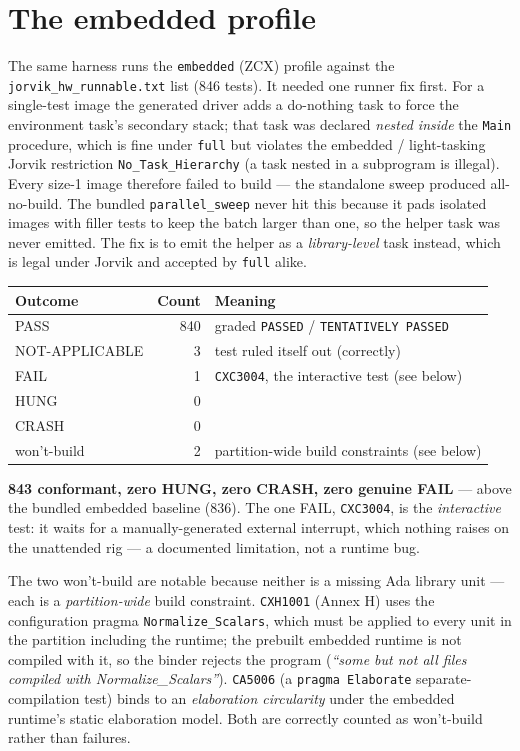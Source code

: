 \section{The embedded profile}

The same harness runs the \texttt{embedded} (ZCX) profile against the
\texttt{jorvik\_hw\_runnable.txt} list (846 tests). It needed one runner fix first. For a
single-test image the generated driver adds a do-nothing task to force the environment
task's secondary stack; that task was declared \emph{nested inside} the \texttt{Main}
procedure, which is fine under \texttt{full} but violates the embedded / light-tasking
Jorvik restriction \texttt{No\_Task\_Hierarchy} (a task nested in a subprogram is illegal).
Every size-1 image therefore failed to build --- the standalone sweep produced
all-no-build. The bundled \texttt{parallel\_sweep} never hit this because it pads
isolated images with filler tests to keep the batch larger than one, so the helper task
was never emitted. The fix is to emit the helper as a \emph{library-level} task instead,
which is legal under Jorvik and accepted by \texttt{full} alike.

\begin{longtable}{p{4.5cm} r p{6.5cm}}
\toprule
\textbf{Outcome} & \textbf{Count} & \textbf{Meaning} \\ \midrule
\endhead
PASS                & 840 & graded \texttt{PASSED} / \texttt{TENTATIVELY PASSED} \\
NOT-APPLICABLE      & 3   & test ruled itself out (correctly) \\
FAIL                & 1   & \texttt{CXC3004}, the interactive test (see below) \\
HUNG                & 0   & \\
CRASH               & 0   & \\
won't-build         & 2   & partition-wide build constraints (see below) \\
\bottomrule
\end{longtable}

\textbf{843 conformant, zero HUNG, zero CRASH, zero genuine FAIL} --- above the bundled
embedded baseline (836). The one FAIL, \texttt{CXC3004}, is the \emph{interactive} test:
it waits for a manually-generated external interrupt, which nothing raises on the
unattended rig --- a documented limitation, not a runtime bug.

The two won't-build are notable because neither is a missing Ada library unit ---
each is a \emph{partition-wide} build constraint. \texttt{CXH1001} (Annex H) uses the
configuration pragma \texttt{Normalize\_Scalars}, which must be applied to every unit in
the partition including the runtime; the prebuilt embedded runtime is not compiled with it,
so the binder rejects the program (\emph{``some but not all files compiled with
Normalize\_Scalars''}). \texttt{CA5006} (a \texttt{pragma Elaborate} separate-compilation
test) binds to an \emph{elaboration circularity} under the embedded runtime's static
elaboration model. Both are correctly counted as won't-build rather than failures.

